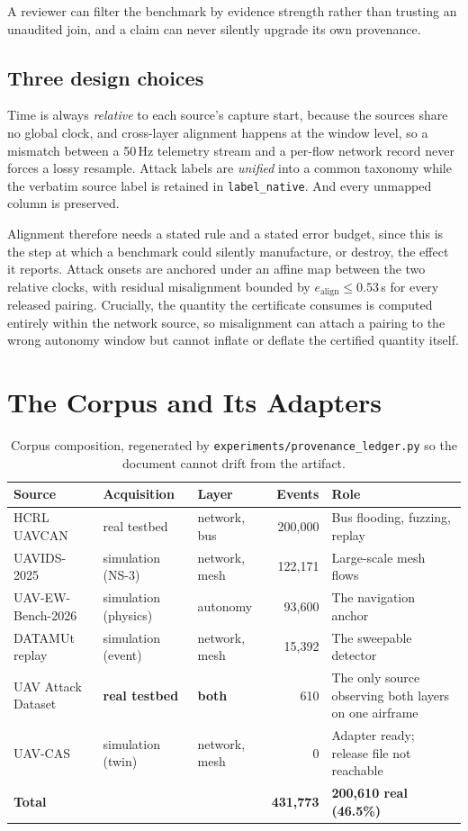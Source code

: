 \documentclass[11pt,a4paper]{article}
\newcommand{\code}[1]{\texttt{#1}}
\begin{document}
A reviewer can filter the benchmark by evidence strength rather than trusting an
unaudited join, and a claim can never silently upgrade its own provenance.

\subsection{Three design choices}
Time is always \emph{relative} to each source's capture start, because the
sources share no global clock, and cross-layer alignment happens at the window
level, so a mismatch between a 50\,Hz telemetry stream and a per-flow network
record never forces a lossy resample. Attack labels are \emph{unified} into a
common taxonomy while the verbatim source label is retained in
\code{label\_native}. And every unmapped column is preserved.

Alignment therefore needs a stated rule and a stated error budget, since this is
the step at which a benchmark could silently manufacture, or destroy, the effect
it reports. Attack onsets are anchored under an affine map between the two
relative clocks, with residual misalignment bounded by
$e_{\mathrm{align}}\le0.53$\,s for every released pairing. Crucially, the
quantity the certificate consumes is computed entirely within the network
source, so misalignment can attach a pairing to the wrong autonomy window but
cannot inflate or deflate the certified quantity itself.

\section{The Corpus and Its Adapters}
\label{sec:corpus}

\begin{table}[H]
\centering\footnotesize
\begin{tabularx}{\linewidth}{@{}p{3.3cm}p{2.4cm}p{1.6cm}rX@{}}
\toprule
\textbf{Source} & \textbf{Acquisition} & \textbf{Layer} & \textbf{Events} & \textbf{Role} \\
\midrule
HCRL UAVCAN & real testbed & network, bus & 200,000 & Bus flooding, fuzzing, replay \\
UAVIDS-2025 & simulation (NS-3) & network, mesh & 122,171 & Large-scale mesh flows \\
UAV-EW-Bench-2026 & simulation (physics) & autonomy & 93,600 & The navigation anchor \\
DATAMUt replay & simulation (event) & network, mesh & 15,392 & The sweepable detector \\
UAV Attack Dataset & \textbf{real testbed} & \textbf{both} & 610 & The only source observing both layers on one airframe \\
UAV-CAS & simulation (twin) & network, mesh & 0 & Adapter ready; release file not reachable \\
\midrule
\textbf{Total} & & & \textbf{431,773} & \textbf{200,610 real (46.5\%)} \\
\bottomrule
\end{tabularx}
\caption{Corpus composition, regenerated by
\code{experiments/provenance\_ledger.py} so the document cannot drift from the
artifact.}
\end{table}
\end{document}
